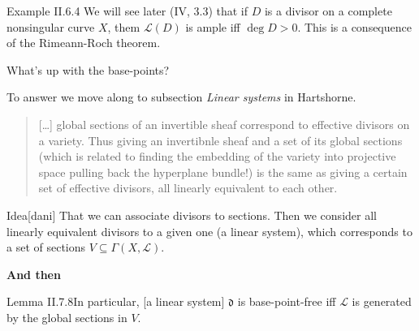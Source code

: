 \begin{thing4}{Example II.6.4}\label{exer:}\leavevmode
	We will see later (IV, 3.3) that if  \(D\) is a divisor on a complete nonsingular curve \(X\), them \(\mathcal{L}(D)\) is ample iff \(\operatorname{deg}D>0\). This is a consequence of the Rimeann-Roch theorem.
\end{thing4}

\begin{question}\leavevmode
What's up with the base-points?
\end{question}

To answer we move along to subsection  \textit{Linear systems} in Hartshorne.
\begin{quotation}
	[…] global sections of an invertible sheaf correspond to effective divisors on a variety. Thus giving an invertibnle sheaf and a set of its global sections {\color{6}(which is related to finding the embedding of the variety into projective space pulling back the hyperplane bundle!)} is the same as giving a certain set of effective divisors, all linearly equivalent to each other.
\end{quotation}

\begin{thing6}{Idea}[dani]\leavevmode
That we can associate divisors to sections. Then we consider all linearly equivalent divisors to a given one (a linear system), which corresponds to a set of sections \(V \subseteq \Gamma(X,\mathcal{L})\).
\end{thing6}

\textbf{And then} 
\begin{thing4}{Lemma II.7.8}\label{lem:II.7.8}\leavevmode
	[…] In particular, [a linear system] \(\mathfrak{d}\) is base-point-free iff \(\mathcal{L}\) is generated by the global sections in \(V\).
\end{thing4}
